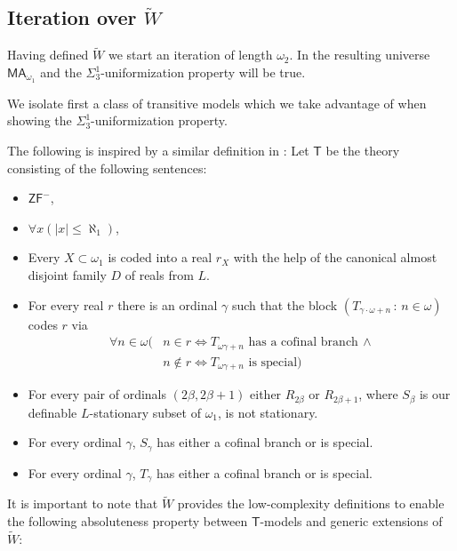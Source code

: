 \documentclass[a4paper,12pt]{article}
\newcommand{\ZFP}{\mathsf{ZF}^-}
\newcommand{\MA}{\mathsf{MA}_{\omega_1}}
\newcommand{\T}{\mathsf{T}}
\begin{document}
\subsection{Iteration over $\tilde{W}$}
Having defined $\tilde{W}$ we start an iteration of length $\omega_2$. In the resulting universe $\MA$ and the $\Sigma^1_3$-uniformization property will be true. 


We isolate first a class of transitive models which we take advantage of when showing the $\Sigma^1_3$-uniformization property.

The following is inspired by a similar definition in \cite{CV}:
Let $\T$ be the theory consisting of the following sentences:
\begin{itemize}
\item $\ZFP$,
\item $\forall x (|x| \le \aleph_1)$,
\item Every $X \subset \omega_1$ is coded into a real $r_X$ with the help of the canonical almost disjoint family $D$ of reals from $L$.
\item For every real $r$ there is an ordinal $\gamma$ such that the block $(T_{\gamma \cdot \omega + n}\,  : \, n \in \omega)$ codes $r$ via
\begin{align*}
\forall n \in \omega (& n \in r \Leftrightarrow T_{\omega \gamma + n} \text{ has a cofinal branch} \,  \land \\ &n \notin r \Leftrightarrow T_{\omega \gamma + n} \text{ is special})
\end{align*}
\item For every pair of ordinals $(2\beta, 2\beta+1)$ either $R_{2\beta}$ or $R_{2\beta+1}$, where $S_{\beta}$ is our definable $L$-stationary subset of $\omega_1$, is not stationary.
\item For every ordinal $\gamma$, $S_{\gamma}$ has either a cofinal branch or is special.
\item For every ordinal $\gamma$, $T_{\gamma}$ has either a cofinal branch or is special.
\end{itemize} 
It is important to note that $\tilde{W}$ provides the low-complexity definitions to enable the following absoluteness property between  $\T$-models and generic extensions of $\tilde{W}$:
\end{document}

